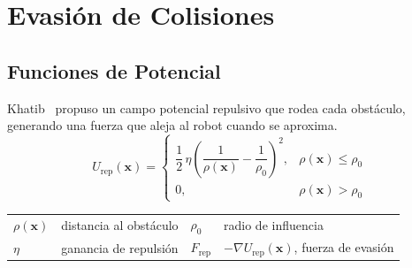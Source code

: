 \section{Evasión de Colisiones}
\setlength{\columnseprule}{0pt}
\onecolumn
\subsection{Funciones de Potencial}
Khatib~\cite{Khatib1986} propuso un campo potencial repulsivo que rodea cada obstáculo, generando una fuerza que aleja al robot cuando se aproxima.
\begin{equation*}
    U_{\text{rep}}(\mathbf{x}) =
    \begin{cases}
        \dfrac{1}{2}\,\eta\left(\dfrac{1}{\rho(\mathbf{x})}-\dfrac{1}{\rho_0}\right)^{\!2}, & \rho(\mathbf{x})\leq\rho_0 \\[6pt]
        0, & \rho(\mathbf{x})>\rho_0
    \end{cases}
\end{equation*}
{\footnotesize
\noindent
\begin{tabular}{l@{\ }l@{\qquad}l@{\ }l}
$\rho(\mathbf{x})$ & distancia al obstáculo & $\rho_0$ & radio de influencia \\
$\eta$ & ganancia de repulsión & $F_{\text{rep}}$ & $-\nabla U_{\text{rep}}(\mathbf{x})$, fuerza de evasión \\
\end{tabular}
}

